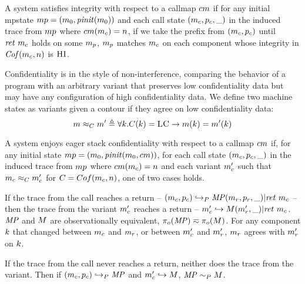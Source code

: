 \documentclass[acmsmall,review,anonymous]{acmart}\settopmatter{printfolios=true,printccs=false,printacmref=false}
\begin{document}
A system satisfies integrity with respect to a callmap \(cm\)
if for any initial mpstate \(mp =
(m_0,\mathit{pinit}(m_0))\) and each call state
\((m_c,p_c,\_)\) in the induced trace from \(mp\)
where \(cm(m_c) = n\), if we take the prefix from
\((m_c,p_c)\) until \(\mathit{ret}\ m_c\) holds on some
\(m_p\), \(m_p\) matches \(m_c\) on each component whose integrity
in \(\mathit{Cof}(m_c,n)\) is \(\textsc{HI}\).


Confidentiality is in the style of non-interference, comparing the behavior of
a program with an arbitrary variant that preserves low confidentiality data but
may have any configuration of high confidentiality data. We define two machine
states as variants given a contour if they agree on low confidentiality data:
  \[m \approx_C m' \triangleq \forall k .
    C(k) = \textsc{LC} \rightarrow m(k) = m'(k)\]

A system enjoys eager stack confidentiality with respect to a callmap
\(cm\) if, for any initial state \(mp =
(m_0,\mathit{pinit}(m_0,cm))\), for each call state
\((m_c,p_c,\_)\) in the induced trace from \(mp\)
where \(cm(m_c) = n\) and each variant \(m_c'\) such that
\(m_c \approx_C m_c'\) for \(C = Cof(m_c, n)\),
one of two cases holds.

If the trace from the call reaches a return -- \((m_c,p_c)
\hookrightarrow_P \mathit{MP} (m_r,p_r,\_) | \mathit{ret}\ m_c\) --
then the trace from the variant \(m_c'\) reaches a return --
\(m_c' \hookrightarrow M (m_r',\_) | \mathit{ret}\ m_c\).
\(\mathit{MP}\) and \(M\) are observationally equivalent, \(\pi_o(\mathit{MP}) \eqsim
\pi_o(M)\). For any component \(k\) that changed between
\(m_c\) and \(m_r\), or between \(m_c'\) and \(m_r'\),
\(m_r\) agrees with \(m_r'\) on \(k\).

If the trace from the call never reaches a return, neither does the
trace from the variant. Then if \((m_c,p_c) \hookrightarrow_P
\mathit{MP}\) and \(m_c' \hookrightarrow M\), \(\mathit{MP} \sim_P M\).

\end{document}
